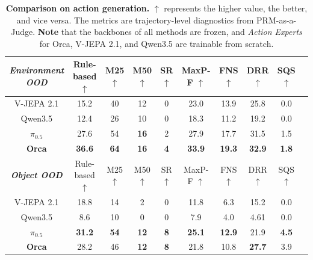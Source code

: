 \begin{table}[t]
  \centering
  \small
  \setlength{\tabcolsep}{2.7mm}
  \begin{threeparttable}
  \caption{\textbf{Comparison on action generation.} $\uparrow$ represents the higher value, the better, and vice versa.
  The metrics are trajectory-level diagnostics from PRM-as-a-Judge. \textbf{Note} that the backbones of all methods are frozen, and \textit{Action Experts} for Orca, V-JEPA 2.1, and Qwen3.5 are trainable from scratch.}\label{tab:comparison_changing_world}
    \begin{tabular}{c|c|cccccccc}
    \toprule[1pt]
    \textbf{\textit{Environment OOD}}& Rule-based $\uparrow$ & M25 $\uparrow$\tnote{1} & M50 $\uparrow$\tnote{1} & SR $\uparrow$\tnote{2} & MaxP-F $\uparrow$\tnote{3} &  FNS $\uparrow$\tnote{4} & DRR $\uparrow$\tnote{5}  & SQS $\uparrow$\tnote{6} \\
    \midrule[0.5pt]
    V-JEPA 2.1 &15.2  & 40    & 12    & 0     & 23.0   & 13.9   & 25.8  &  0.0\\
    Qwen3.5 & 12.4  & 26    & 10    & 0     & 18.3   & 11.2   & 19.2  &  0.0\\
    $\pi_{0.5}$ & 27.6  & 54    & \textbf{16} & 2     & 27.9  & 17.7   & 31.5  &  1.5\\
    \rowcolor[rgb]{ .89,  .949,  .851}\textbf{Orca} &\textbf{36.6} & \textbf{64} & \textbf{16} & \textbf{4} & \textbf{33.9}   & \textbf{19.3}  & \textbf{32.9} & \textbf{1.8} \\
    \midrule[1pt]
    
    \multicolumn{1}{c}{\textbf{\textit{Object OOD}}} & Rule-based $\uparrow$   & M25 $\uparrow$ & M50 $\uparrow$ & SR $\uparrow$ & MaxP-F $\uparrow$ & FNS $\uparrow$  & DRR $\uparrow$  & SQS $\uparrow$ \\
    \midrule[0.5pt]
    V-JEPA 2.1 &18.8  & 14    & 2     & 0     & 11.8  & 6.3    & 15.2  & 0.0 \\
    Qwen3.5 & 8.6   & 10    & 0     & 0     & 7.9   & 4.0     & 4.61  & 0.0\\
    $\pi_{0.5}$& \textbf{31.2} & \textbf{54}    & \textbf{12} & \textbf{8} & \textbf{25.1}  & \textbf{12.9}   & 21.9  & \textbf{4.5} \\
    \rowcolor[rgb]{ .89,  .949,  .851}\textbf{Orca} & 28.2  & 46 & \textbf{12}    & \textbf{8} & 21.8  &  10.8 & \textbf{27.7} & 3.9 \\
    \midrule[1pt]
    

\end{tabular}
\end{threeparttable}
\end{table}
